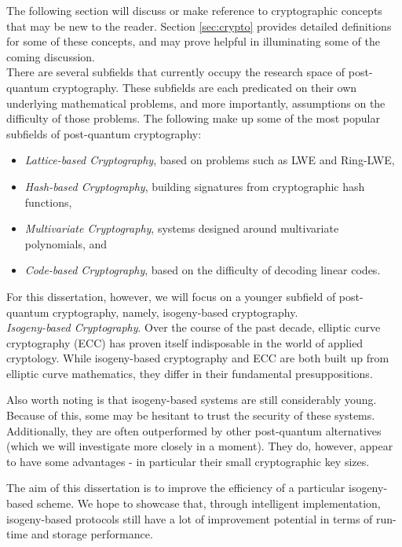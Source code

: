 The following section will discuss or make reference to cryptographic concepts that may be new to the reader. Section  \ref{sec:crypto} provides detailed definitions for some of these concepts, and may prove helpful in illuminating some of the coming discussion.\\

There are several subfields that currently occupy the research space of post-quantum cryptography. These subfields are each predicated on their own underlying mathematical problems, and more importantly, assumptions on the difficulty of those problems. The following make up some of the most popular subfields of post-quantum cryptography: 
\begin{itemize}
\item \textit{Lattice-based Cryptography}, based on problems such as LWE and Ring-LWE, 
\item \textit{Hash-based Cryptography}, building signatures from cryptographic hash functions, 
\item \textit{Multivariate Cryptography}, systems designed around multivariate polynomials, and
\item \textit{Code-based Cryptography}, based on the difficulty of decoding linear codes.
\end{itemize}

For this dissertation, however, we will focus on a younger subfield of post-quantum cryptography, namely, isogeny-based cryptography.\\

\noindent
\textit{Isogeny-based Cryptography}. Over the course of the past decade, elliptic curve cryptography (ECC) has proven itself indisposable in the world of applied cryptology. While isogeny-based cryptography and ECC are both built up from elliptic curve mathematics, they differ in their fundamental presuppositions.

Also worth noting is that isogeny-based systems are still considerably young. Because of this, some may be hesitant to trust the security of these systems. Additionally, they are often outperformed by other post-quantum alternatives (which we will investigate more closely in a moment). They do, however, appear to have some advantages - in particular their small cryptographic key sizes. 

The aim of this dissertation is to improve the efficiency of a particular isogeny-based scheme. We hope to showcase that, through intelligent implementation, isogeny-based protocols still have a lot of improvement potential in terms of run-time and storage performance.

